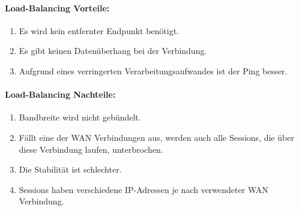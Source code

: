 \paragraph{Load-Balancing Vorteile:}
\begin{enumerate}
    \item Es wird kein entfernter Endpunkt benötigt.
    \item Es gibt keinen Datenüberhang bei der Verbindung.
    \item Aufgrund eines verringerten Verarbeitungsaufwandes ist der Ping besser. 
\end{enumerate}
\paragraph{Load-Balancing Nachteile:}
\begin{enumerate}
    \item Bandbreite wird nicht gebündelt.
    \item Fällt eine der WAN Verbindungen aus, werden auch alle Sessions, die über diese Verbindung laufen, unterbrochen.
    \item Die Stabilität ist schlechter.
    \item Sessions haben verschiedene IP-Adressen je nach verwendeter WAN Verbindung.
\end{enumerate}


